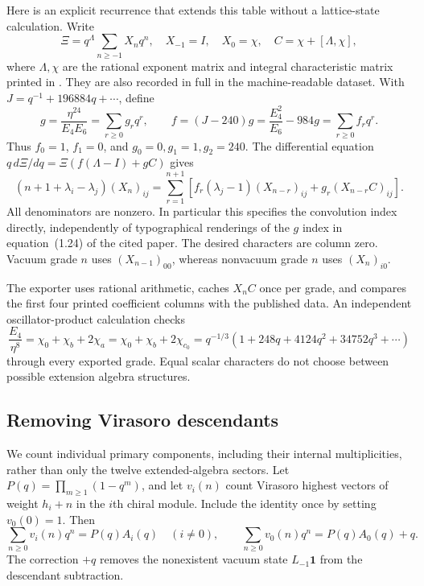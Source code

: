 Here is an explicit recurrence that extends this table without a
lattice-state calculation.  Write
\[
 \Xi=q^\Lambda\sum_{n\geq-1}X_nq^n,
 \quad X_{-1}=I,\quad X_0=\chi,
 \quad C=\chi+[\Lambda,\chi],
\]
where $\Lambda,\chi$ are the rational exponent matrix and integral
characteristic matrix printed in \cite[Section~2.4]{EG}.  They are
also recorded in full in the machine-readable dataset.  With
$J=q^{-1}+196884q+\cdots$, define
\[
 g=\frac{\eta^{24}}{E_4E_6}=\sum_{r\geq0}g_rq^r,
 \qquad
 f=(J-240)g
   =\frac{E_4^2}{E_6}-984g=\sum_{r\geq0}f_rq^r.
\]
Thus $f_0=1$, $f_1=0$, and $g_0=0,g_1=1,g_2=240$.
The differential equation $q\,d\Xi/dq=\Xi(f(\Lambda-I)+gC)$ gives
\begin{equation}\label{eq:physics-xi-recurrence}
 (n+1+\lambda_i-\lambda_j)(X_n)_{ij}
 =\sum_{r=1}^{n+1}
 \left[f_r(\lambda_j-1)(X_{n-r})_{ij}
       +g_r(X_{n-r}C)_{ij}\right].
\end{equation}
All denominators are nonzero.  In particular this specifies the
convolution index directly, independently of typographical renderings
of the $g$ index in equation~(1.24) of the cited paper.  The desired
characters are column zero.  Vacuum grade $n$ uses $(X_{n-1})_{00}$,
whereas nonvacuum grade $n$ uses $(X_n)_{i0}$.

The exporter uses rational arithmetic, caches $X_nC$ once per grade,
and compares the first four printed coefficient columns with the
published data.  An independent oscillator-product calculation checks
\begin{equation}\label{eq:physics-e8-character-identity}
 \frac{E_4}{\eta^8}
 =\chi_0+\chi_b+2\chi_a
 =\chi_0+\chi_b+2\chi_{c_0}
 =q^{-1/3}(1+248q+4124q^2+34752q^3+\cdots)
\end{equation}
through every exported grade.  Equal scalar characters do not choose
between possible extension algebra structures.

\subsection{Removing Virasoro descendants}

We count individual primary components, including their internal
multiplicities, rather than only the twelve extended-algebra sectors.
Let $P(q)=\prod_{m\geq1}(1-q^m)$, and let $v_i(n)$ count Virasoro
highest vectors of weight $h_i+n$ in the $i$th chiral module.  Include
the identity once by setting $v_0(0)=1$.  Then
\begin{equation}\label{eq:physics-primary-extraction}
 \sum_{n\geq0}v_i(n)q^n=P(q)A_i(q)\quad(i\ne0),
 \qquad
 \sum_{n\geq0}v_0(n)q^n=P(q)A_0(q)+q.
\end{equation}
The correction $+q$ removes the nonexistent vacuum state
$L_{-1}\mathbf1$ from the descendant subtraction.

